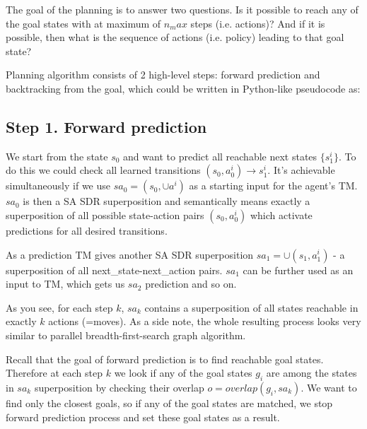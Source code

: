 \documentclass[a4paper]{article}
\begin{document}
The goal of the planning is to answer two questions. Is it possible to reach any of the goal states with at maximum of $n_max$ steps (i.e. actions)? And if it is possible, then what is the sequence of actions (i.e. policy) leading to that goal state?

Planning algorithm consists of 2 high-level steps: forward prediction and backtracking from the goal, which could be written in Python-like pseudocode as:



\subsection{Step 1. Forward prediction}

We start from the state $s_0$ and want to predict all reachable next states $\{s_1^i\}$. To do this we could check all learned transitions $(s_0, a_0^i) \rightarrow s_1^i$. It's achievable simultaneously if we use $sa_0 = (s_0, \cup a^i)$ as a starting input for the agent's TM. $sa_0$ is then a SA SDR superposition and semantically means exactly a superposition of all possible state-action pairs $(s_0, a_0^i)$ which activate predictions for all desired transitions.


As a prediction TM gives another SA SDR superposition $sa_1 = \cup (s_1, a_1^i)$ - a superposition of all next\_state-next\_action pairs. $sa_1$ can be further used as an input to TM, which gets us $sa_2$ prediction and so on.

As you see, for each step $k$, $sa_k$ contains a superposition of all states reachable in exactly $k$ actions (=moves). As a side note, the whole resulting process looks very similar to parallel breadth-first-search graph algorithm.

Recall that the goal of forward prediction is to find reachable goal states. Therefore at each step $k$ we look if any of the goal states $g_i$ are among the states in $sa_k$ superposition by checking their overlap $o = overlap(g_i, sa_k)$. We want to find only the closest goals, so if any of the goal states are matched, we stop forward prediction process and set these goal states as a result.
\end{document}
